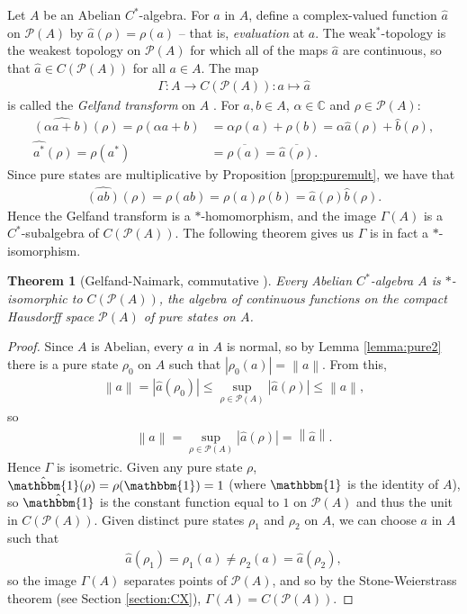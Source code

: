 \documentclass[11pt,a4paper]{report}
\theoremstyle{plain}
\newtheorem{thm}{Theorem}
\theoremstyle{definition}
\newcommand{\1}{\mathbbm{1}}
\newcommand{\C}{\mathbb{C}}
\renewcommand{\P}[1]{\mathscr{P}(#1)}
\begin{document}
Let $A$ be an Abelian $C^\ast$-algebra. For $a$ in $A$, define a complex-valued 
function $\hat{a}$ on $\P{A}$ by $\hat{a}(\rho)= \rho(a)$ -- that is, 
\emph{evaluation} at $a$. The weak$^\ast$-topology is the weakest topology on 
$\P{A}$ for which all of the maps $\hat{a}$ are continuous, so that $\hat{a} \in 
C(\P{A})$ for all $a\in A$. The map
\begin{align*}
	\Gamma:A \to C(\P{A}) : a\mapsto \hat{a}
\end{align*}
is called the \emph{Gelfand transform} on $A$ \cite{davidson96}.
For $a,b \in A$, $\alpha\in\C$ and $\rho\in\P{A}$:
\begin{align*}
		\widehat{(\alpha a+ b)}(\rho) = \rho(\alpha a+ b) 
	&=	\alpha\rho(a) +\rho(b) = \alpha\hat{a}(\rho)+\hat{b}(\rho), 			\\
		\widehat{a^\ast}(\rho) = \rho(a^\ast) 
	&= \overline{\rho(a)} = \overline{\hat{a}(\rho)}.
\end{align*}
Since pure states are multiplicative by Proposition \ref{prop:puremult}, we have that 
\begin{align*}
	\widehat{(ab)} (\rho)= \rho(ab) = \rho(a)\rho(b) = \hat{a}(\rho)\hat{b}(\rho).
\end{align*}
Hence the Gelfand transform is a $\ast$-homomorphism, and the image $\Gamma(A)$ 
is a $C^\ast$-subalgebra of $C(\P A)$. The following theorem gives us $\Gamma$ 
is in fact a $\ast$-isomorphism.


\begin{thm}[{Gelfand-Naimark, commutative \cite[4.4.3]{kadison83}}] \label{thm:gnc}
	Every Abelian $C^\ast$-algebra $A$ is $\ast$-isomorphic to $C(\P A)$, the 
	algebra of continuous functions on the compact Hausdorff space $\P A$ of pure 
	states on $A$.

\end{thm}
\begin{proof}
	Since $A$ is Abelian, every $a$ in $A$ is normal, so by Lemma \ref{lemma:pure2} 
	there is a pure state $\rho_0$ on $A$ such that $|\rho_0(a)|=\left\|a\right\|$. 
	From this, 
	\begin{align*}
		\left\|a\right\|	=|\hat a(\rho_0)|\leq \sup_{\rho\in\P A}|\hat a(\rho)| 
							\leq \left\|a\right\|,
	\end{align*}
	so 
	\begin{align*}
		\left\|a\right\|=\sup_{\rho\in\P A} |\hat a (\rho)| = \left\|\hat a\right\|.
	\end{align*}
	Hence $\Gamma$ is isometric.
	Given any pure state $\rho$, $\hat \1(\rho) = \rho(\1) = 1$ (where $\1$ is the 
	identity of $A$), so $\hat\1$ is the constant function equal to $1$ on $\P A$ 
	and thus the unit in $C(\P A)$. Given distinct pure states $\rho_1$ and $\rho_2$ 
	on $A$, we can choose $a$ in $A$ such that 
	\begin{align*}
		\hat a(\rho_1) = \rho_1(a) \not= \rho_2(a) = \hat a(\rho_2),
	\end{align*}
	so the image $\Gamma(A)$ separates points of $\P A$, and so by the 
	Stone-Weierstrass theorem (see Section \ref{section:CX}), $\Gamma(A)=C(\P A)$.

\end{proof}
\end{document}
